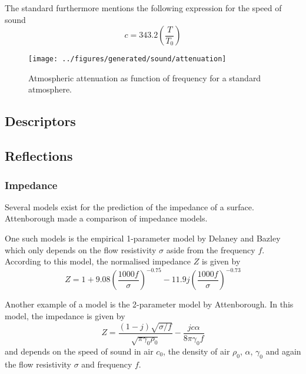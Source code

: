 The standard furthermore mentions the following expression for the speed of sound
\begin{equation}
c = 343.2 \left( \frac{T}{T_0} \right)
\end{equation}

\begin{figure}[H]
        \centering
        \texttt{[image: ../figures/generated/sound/attenuation]}
        \caption{Atmospheric attenuation as function of frequency for a standard atmosphere.}
        \label{fig:theory:sound:attenuation}
\end{figure}

\subsection{Descriptors}


\newpage
\subsection{Reflections}

\subsubsection{Impedance}
Several models exist for the prediction of the impedance of a surface.
Attenborough made a comparison of impedance models\cite{Attenborough2011a}.


One such models is the empirical 1-parameter model by Delaney and Bazley which
only depends on the flow resistivity $\sigma$ aside from the frequency $f$.
According to this model, the normalised impedance $Z$ is given by
\begin{equation}\label{eq:theory:sound:impedance:db}
 Z = 1 + 9.08 \left( \frac{1000f}{\sigma}\right)^{-0.75} - 11.9 j \left( \frac{1000f}{\sigma}\right)^{-0.73}
\end{equation}

Another example of a model is the 2-parameter model by Attenborough. In this model, the impedance is given by
\begin{equation}\label{eq:theory:sound:impedance:att}
 Z = \frac{\left( 1-j\right) \sqrt{\sigma/f}}{\sqrt{\pi \gamma_0 \rho_0}} - \frac{jc\alpha}{8 \pi \gamma_0 f}
\end{equation}
and depends on the speed of sound in air $c_0$, the density of air $\rho_0$, $\alpha$, $\gamma_0$ and again the flow resistivity $\sigma$ and frequency $f$.

%
%
%



